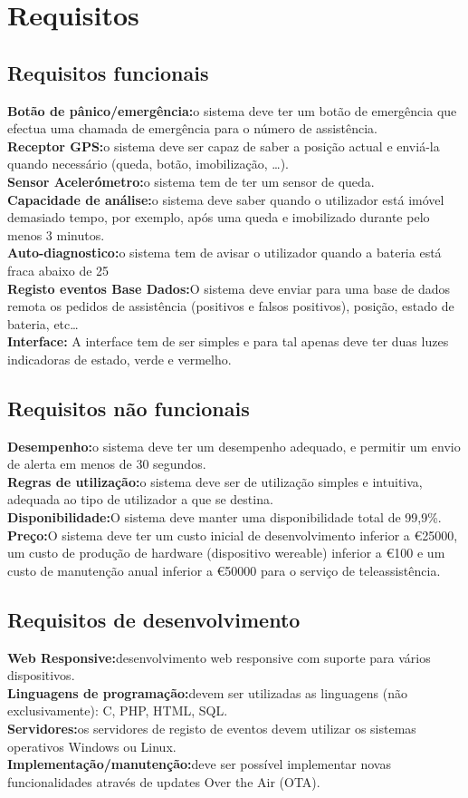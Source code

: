 \section{Requisitos}
\subsection{Requisitos funcionais}
\textbf{Botão de pânico/emergência:}o sistema deve ter um botão de emergência que efectua uma chamada de emergência para o número de assistência.
\\
\textbf{Receptor GPS:}o sistema deve ser capaz de saber a posição actual e enviá-la quando necessário (queda, botão, imobilização, …).
\\
\textbf{Sensor Acelerómetro:}o sistema tem de ter um sensor de queda.
\\
\textbf{Capacidade de análise:}o sistema deve saber quando o utilizador está imóvel demasiado tempo, por exemplo, após uma queda e imobilizado durante pelo menos 3 minutos.
\\
\textbf{Auto-diagnostico:}o sistema tem de avisar o utilizador quando a bateria está fraca abaixo de 25%
\\
\textbf{Registo eventos Base Dados:}O sistema deve enviar para uma base de dados remota os pedidos de assistência (positivos e falsos positivos), posição, estado de bateria, etc…
\\
\textbf{Interface:} A interface tem de ser simples e para tal apenas deve ter duas luzes indicadoras de estado, verde e vermelho.

\subsection{Requisitos não funcionais}
\textbf{Desempenho:}o sistema deve ter um desempenho adequado, e permitir um envio de alerta em menos de 30 segundos.
\\
\textbf{Regras de utilização:}o sistema deve ser de utilização simples e intuitiva, adequada ao tipo de utilizador a que se destina.
\\
\textbf{Disponibilidade:}O sistema deve manter uma disponibilidade total de 99,9\%. 
\\
\textbf{Preço:}O sistema deve ter um custo inicial de desenvolvimento inferior a \euro25000, um custo de produção de hardware (dispositivo wereable) inferior a \euro100 e um custo de manutenção anual inferior a \euro50000 para o serviço de teleassistência.

\subsection{Requisitos de desenvolvimento}
\textbf{Web Responsive:}desenvolvimento web responsive com suporte para vários dispositivos.
\\
\textbf{Linguagens de programação:}devem ser utilizadas as linguagens (não exclusivamente): C, PHP, HTML, SQL.
\\
\textbf{Servidores:}os servidores de registo de eventos devem utilizar os sistemas operativos Windows ou Linux.
\\
\textbf{Implementação/manutenção:}deve ser possível implementar novas funcionalidades através de updates Over the Air (OTA).